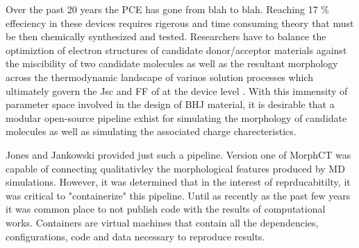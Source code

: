 Over the past 20 years the PCE has gone from blah to blah. Reaching 17 \% effeciency in these devices requires
rigerous and time consuming theory that must be then chemically synthesized and tested. Researchers have to
balance the optimiztion of electron structures of candidate donor/acceptor materials against the miscibility
of two candidate molecules as well as the resultant morphology across the thermodynamic landscape of
variuos solution processes which ultimately govern the Jsc and FF of at the device level \cite{Zhu2020a}. 
With this immensity of parameter space involved in the design of BHJ material, it is desirable that a modular
open-source pipeline exhist for simulating the morphology of candidate molecules as well as simulating the 
associated charge charecteristics. 

\newline \indent Jones and Jankowski provided just such a pipeline. Version one of MorphCT was capable of
connecting qualitativley the morphological features produced by MD simulations. However, it was determined
that in the interest of reprducabitilty, it was critical to "containerize" this pipeline. Until as recently as
the past few years it was common place to not publish code with the results of computational works. Containers
are virtual machines that contain all the dependencies, configurations, code and data necessary to reproduce
results. \cite{Cito2016a}
